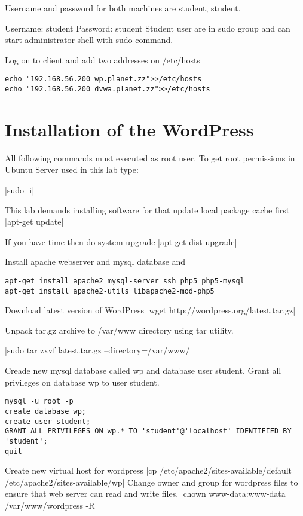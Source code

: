Username and password for both machines are student, student.

Username: student
Password: student
Student user are in sudo group and can start administrator shell with sudo command.

Log on to client and add two addresses on /etc/hosts
\begin{verbatim}
echo "192.168.56.200 wp.planet.zz">>/etc/hosts
echo "192.168.56.200 dvwa.planet.zz">>/etc/hosts
\end{verbatim}

\section{Installation of the WordPress}
All following commands must executed as root user. To get root permissions in Ubuntu Server used in this lab type:

|sudo -i|


This lab demands installing software for that update local package cache first
|apt-get update|

If you have time then do system upgrade
|apt-get dist-upgrade|

Install apache webserver and mysql database and 
\begin{verbatim}
apt-get install apache2 mysql-server ssh php5 php5-mysql 
apt-get install apache2-utils libapache2-mod-php5
\end{verbatim}

Download latest version of WordPress
|wget http://wordpress.org/latest.tar.gz|

Unpack tar.gz archive to  /var/www directory using tar utility.

|sudo tar zxvf latest.tar.gz --directory=/var/www/|

Creade new mysql database called wp and database user student. Grant all privileges on database wp to user student.

\begin{verbatim}
mysql -u root -p
create database wp;
create user student;
GRANT ALL PRIVILEGES ON wp.* TO 'student'@'localhost' IDENTIFIED BY 'student';
quit
\end{verbatim}

Create new virtual host for wordpress 
|cp /etc/apache2/sites-available/default /etc/apache2/sites-available/wp|
Change owner and group for wordpress files to ensure that web server can read and write files.
|chown www-data:www-data /var/www/wordpress -R|

